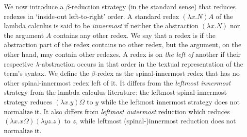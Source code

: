 \documentclass{elsarticle}
\theoremstyle{plain}
\theoremstyle{definition}
\begin{document}
We now introduce a $\beta$-reduction strategy (in the standard sense)
that reduces redexes in `inside-out left-to-right' order.
A standard redex $(\lambda x . N) A$ of the lambda calculus is said to be \emph{innermost} if neither the abstraction $(\lambda x . N)$ nor the argument $A$  contains any other redex.
We say that a redex is  if the abstraction part of the redex contains no other redex, but the argument, on the other hand, may contain other redexes.
A redex is on \emph{the left of} another if their respective $\lambda$-abstraction occurs in that order in the textual representation of the term's syntax.
%
We define the  $\beta$-redex as the
spinal-innermost redex that has no other spinal-innermost redex left of it.
%
It differs from the \emph{leftmost innermost} strategy from the lambda calculus literature: the leftmost spinal-innermost strategy reduces
$(\lambda x . y) \Omega$ to $y$ while the leftmost innermost strategy does not normalize it.
It also differs from \emph{leftmost outermost} reduction which reduces
$(\lambda x . x \Omega)(\lambda y z . z)$ to $z$, while
leftmost (spinal-)innermost reduction does not normalize it.

\end{document}
